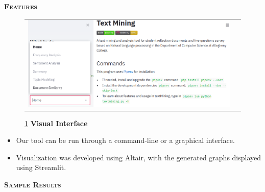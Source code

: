 \documentclass[final,t]{beamer}
\begin{document}
\begin{frame}{}
\begin{columns}
\begin{column}{.5\linewidth}
		\begin{block}{\textsc{\textbf{Features}}}
			\vspace*{3mm}

			\begin{figure}
				\begin{tabular}{cc}
					\hspace*{5mm}
					\includegraphics[scale = 1.1]{graphics/interface.png}
				\end{tabular}				
				\caption{\ref{fig:interface} \textbf{Visual Interface}}
				\label{fig:interface}
			\end{figure}

				\begin{itemize}
					\item  Our tool can be run through a command-line  or a graphical interface.
					\item  Visualization was developed using Altair, with the generated graphs displayed using Streamlit.
				\end{itemize}


			\vspace*{3mm}
		\end{block}

		\begin{block}{\textsc{\textbf{Sample Results}}}
			\vspace*{3mm}
			

\end{block}
\end{column}
\end{columns}
\end{frame}
\end{document}
